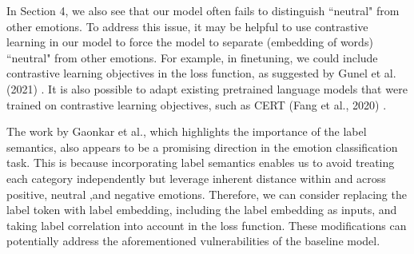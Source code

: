 \documentclass{article}
\begin{document}
In Section 4, we also see that our model often fails to distinguish ``neutral" from other emotions. To address this issue, it may be helpful to use contrastive learning in our model to force the model to separate (embedding of words) ``neutral" from other emotions. For example, in finetuning, we could include contrastive learning objectives in the loss function, as suggested by Gunel et al. (2021) \cite{CLMFT}. It is also possible to adapt existing pretrained language models that were trained on contrastive learning objectives, such as CERT (Fang et al., 2020) \cite{CERT}. 

The work by Gaonkar et al., which highlights the importance of the label semantics, also appears to be a promising direction in the emotion classification task. This is because incorporating label semantics enables us to avoid treating each category independently but leverage inherent distance within and across positive, neutral ,and negative emotions. Therefore, we can consider replacing the label token with label embedding, including the label embedding as inputs, and taking label correlation into account in the loss function. These modifications can potentially address the aforementioned vulnerabilities of the baseline model. 


\newpage
\end{document}

